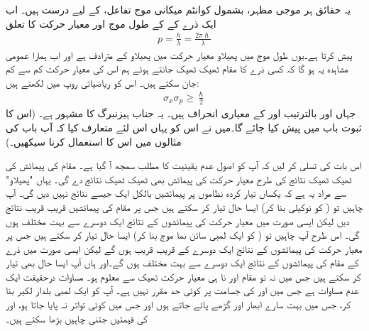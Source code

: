  یہ حقائق ہر موجی مظہر، بشمول کوانٹم میکانی موج تفاعل، کے لیے درست ہیں۔ اب ایک ذرے کے  کے طول موج اور  معیار حرکت کا تعلق  
\begin{align}\label{مساوات_تفاعل_موج_ڈی_بروگلی_معیار_حرکت}
p=\frac{h}{\lambda}=\frac{2\pi\hslash}{\lambda}
\end{align}
پیش کرتا ہے۔یوں طول موج میں پھیلاو معیار حرکت میں پھیلاو کے مترادف  ہے اور  اب ہمارا عمومی مشاہدہ  یہ  ہو گا کہ کسی ذرے کا مقام ٹھیک ٹھیک جانتے ہوئے ہم اس کی معیار حرکت  کم سے کم  جان سکتے ہیں۔ اس کو ریاضیاتی روپ میں لکھتے ہیں:
\begin{align}\label{مساوات_تفاعل_موج_اصول_عدم_یقینیت}
\sigma_{x}\sigma_{p}\ge\frac{\hslash}{2}
\end{align}
جہاں  اور  بالترتیب  اور  کے معیاری انحراف ہیں۔ یہ جناب ہیزنبرگ کا مشہور   ہے۔ (اس کا ثبوت  باب  میں پیش کیا جائے گا۔میں نے اس کو یہاں اس لئے متعارف کیا کہ آپ باب  کی مثالوں میں اس کا استعمال کرنا سیکھیں۔)

 اس بات کی تسلی کر لیں کہ آپ کو اصول عدم یقینیت کا مطلب سمجھ آ گیا ہے۔  مقام کی پیمائش کی ٹھیک ٹھیک نتائج کی طرح معیار حرکت کی پیمائش بھی ٹھیک ٹھیک نتائج دے گی۔ یہاں  "پھیلاو" سے مراد یہ ہے کہ یکساں تیار کردہ  نظاموں پر پیمائشیں  بالکل ایک جیسے نتائج  نہیں دیں گی۔  آپ چاہیں تو ( کو نوکیلی بنا کر) ایسا حال تیار کر سکتے ہیں جس پر مقام کی پیمائشیں قریب قریب نتائج  دیں لیکن ایسی صورت میں معیار حرکت کی پیمائشوں کے نتائج ایک دوسرے سے بہت مختلف ہوں گی۔ اس طرح آپ چاہیں تو ( کو ایک لمبی سائن نما موج بنا کر) ایسا حال تیار کر سکتے ہیں جس پر معیار حرکت کی پیمائشوں کے نتائج ایک دوسرے کے قریب قریب ہوں گے لیکن ایسی صورت میں ذرے کے مقام کی پیمائشوں کے نتائج ایک دوسرے سے بہت مختلف ہوں گے۔اور ہاں آپ ایسا حال بھی تیار کر سکتے ہیں جس میں نہ تو مقام  اور نا ہی معیار حرکت ٹھیک سے معلوم ہو۔ مساوات  درحقیقت ایک عدم مساوات ہے جس میں  اور  کی جسامت پر کوئی حد مقرر نہیں ہے۔ آپ  کو ایک لمبی بلدار لکیر بنا کر، جس میں بہت سارے ابھار اور گڑھے پائے جاتے ہوں اور جس میں کوئی تواتر نہ پایا جاتا ہو،  اور  کی قیمتیں جتنی چاہیں بڑھا سکتے ہیں۔

